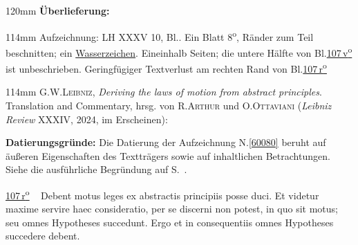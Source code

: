 %
\frenchspacing%
\begin{ledgroupsized}[r]{120mm}%
\footnotesize%
\pstart%
\noindent\textbf{Überlieferung:}%
\pend%
\end{ledgroupsized}%
\begin{ledgroupsized}[r]{114mm}%
\footnotesize%
\pstart%
\parindent -6mm%
%
Aufzeichnung:
LH XXXV 10, Bl..
Ein Blatt 8\textsuperscript{o},
Ränder zum Teil beschnitten;
ein \href{\Scan{LH_35_10_11_107wz}}{Wasserzeichen}.
Eineinhalb Seiten;
die untere Hälfte von Bl.\;\href{\Scan{LH_35_10_11_107v}}{107\,v\textsuperscript{o}} ist unbeschrieben.
Geringfügiger Textverlust am rechten Rand von Bl.\;\href{\Scan{LH_35_10_11_107r}}{107\,r\textsuperscript{o}}
\pend%
\end{ledgroupsized}%
\begin{ledgroupsized}[r]{114mm}%
\footnotesize%
\pstart%
\parindent -6mm%
%
\textsc{G.\:W.\;Leibniz}, \textit{Deriving the laws of motion from abstract principles}. Translation and Commentary, hrsg. von \textsc{R.\;Arthur} und \textsc{O.\;Ottaviani} (\textit{Leibniz Review} XXXIV, 2024, im Erscheinen):\cite{02619}\pend%
\end{ledgroupsized}%
\vspace{5mm}%
\begin{ledgroup}%
\footnotesize%
\pstart%
\noindent%
\textbf{Datierungsgründe:}
Die Datierung der Aufzeichnung N.\;\ref{60080} beruht auf äußeren Eigenschaften des Text\-trägers %
sowie auf inhaltlichen Betrachtungen.
Siehe die ausführliche Begründung auf S.~\pageref{60080_dat}.%
\pend%
\end{ledgroup}%
%
\frenchspacing%
\vspace{8mm}%
\normalsize%
\pstart%
\noindent%
\lbrack%
\href{\Scan{LH_35_10_11_107r}}%
{107\,r\textsuperscript{o}}%
\rbrack\ %
Debent motus leges%
ex abstractis principiis%
posse duci.
Et videtur maxime servire haec consideratio,%
per se discerni non potest,
in quo sit motus;
seu omnes Hypotheses succedunt.%
Ergo et in consequentiis%
omnes Hypotheses succedere debent.%
